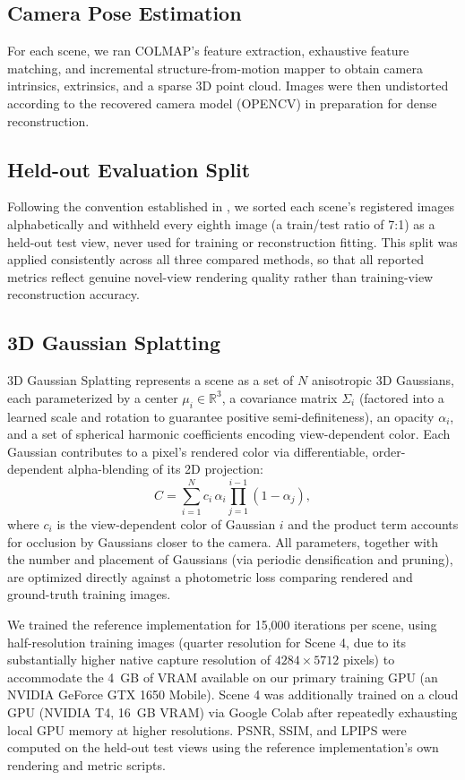 \documentclass[conference]{IEEEtran}
\begin{document}
\subsection{Camera Pose Estimation}
For each scene, we ran COLMAP's feature extraction, exhaustive feature matching, and incremental structure-from-motion mapper \cite{schonberger2016sfm} to obtain camera intrinsics, extrinsics, and a sparse 3D point cloud. Images were then undistorted according to the recovered camera model (OPENCV) in preparation for dense reconstruction.

\subsection{Held-out Evaluation Split}
Following the convention established in \cite{kerbl2023splatting}, we sorted each scene's registered images alphabetically and withheld every eighth image (a train/test ratio of 7:1) as a held-out test view, never used for training or reconstruction fitting. This split was applied consistently across all three compared methods, so that all reported metrics reflect genuine novel-view rendering quality rather than training-view reconstruction accuracy.

\subsection{3D Gaussian Splatting}
3D Gaussian Splatting \cite{kerbl2023splatting} represents a scene as a set of $N$ anisotropic 3D Gaussians, each parameterized by a center $\mu_i \in \mathbb{R}^3$, a covariance matrix $\Sigma_i$ (factored into a learned scale and rotation to guarantee positive semi-definiteness), an opacity $\alpha_i$, and a set of spherical harmonic coefficients encoding view-dependent color. Each Gaussian contributes to a pixel's rendered color via differentiable, order-dependent alpha-blending of its 2D projection:
\begin{equation}
C = \sum_{i=1}^{N} c_i \, \alpha_i \prod_{j=1}^{i-1}(1 - \alpha_j),
\end{equation}
where $c_i$ is the view-dependent color of Gaussian $i$ and the product term accounts for occlusion by Gaussians closer to the camera. All parameters, together with the number and placement of Gaussians (via periodic densification and pruning), are optimized directly against a photometric loss comparing rendered and ground-truth training images.

We trained the reference implementation for 15,000 iterations per scene, using half-resolution training images (quarter resolution for Scene 4, due to its substantially higher native capture resolution of $4284\times5712$ pixels) to accommodate the 4~GB of VRAM available on our primary training GPU (an NVIDIA GeForce GTX 1650 Mobile). Scene 4 was additionally trained on a cloud GPU (NVIDIA T4, 16~GB VRAM) via Google Colab after repeatedly exhausting local GPU memory at higher resolutions. PSNR, SSIM, and LPIPS were computed on the held-out test views using the reference implementation's own rendering and metric scripts.
\end{document}

